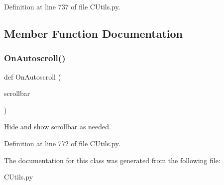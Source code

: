 Definition at line 737 of file C\+Utils.\+py.



\subsection{Member Function Documentation}
\mbox{\label{class_c_utils_1_1_utils_1_1_u_i_1_1_controls_1_1_auto_scroll_container_a94fb94a578671e4db721caa0034bee9a}} 
\subsubsection{\texorpdfstring{On\+Autoscroll()}{OnAutoscroll()}}
{\footnotesize\ttfamily def On\+Autoscroll (\begin{DoxyParamCaption}\item[{}]{scrollbar }\end{DoxyParamCaption})\hspace{0.3cm}{\ttfamily [static]}}

\begin{DoxyVerb}Hide and show scrollbar as needed.\end{DoxyVerb}
 

Definition at line 772 of file C\+Utils.\+py.



The documentation for this class was generated from the following file\+:\begin{DoxyCompactItemize}
\item 
C\+Utils.\+py\end{DoxyCompactItemize}
